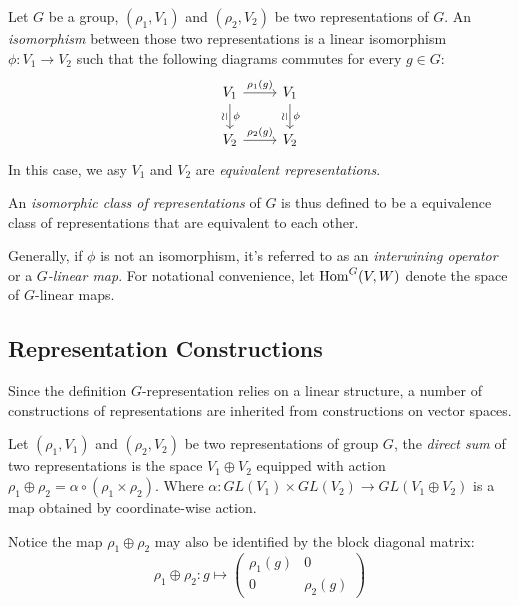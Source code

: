\begin{defn}
  Let $G$ be a group, $(\rho_1, V_1)$ and $(\rho_2, V_2)$ be two representations
  of $G$.  An \emph{isomorphism} between those two representations is a linear
  isomorphism $\phi : V_1 \to V_2$ such that the following diagrams commutes for
  every $g \in G$:
  \[
    \begin{tikzcd}
      V_1 \arrow[d, "\phi", "\vsimeq"'] \arrow[r, "\rho_1(g)"] & V_1 \arrow[d, "\vsimeq"', "\phi"]\\
      V_2 \arrow[r, "\rho_2(g)"] & V_2
    \end{tikzcd}
  \]
  In this case, we asy $V_1$ and $V_2$ are \emph{equivalent representations}.

  An \emph{isomorphic class of representations} of $G$ is thus defined to be a
  equivalence class of representations that are equivalent to each other.


  Generally, if $\phi$ is not an isomorphism, it's referred to as an
  \emph{interwining operator} or a \emph{$G$-linear map}.  For notational
  convenience, let $\operatorname{Hom}^G(V,W)$ denote the space of $G$-linear maps.
\end{defn}

\subsection{Representation Constructions}


Since the definition $G$-representation relies on a linear structure, a number
of constructions of representations are inherited from constructions on vector
spaces.

\begin{defn}
  Let $(\rho_1, V_1)$ and $(\rho_2, V_2)$ be two representations of group $G$,
  the \emph{direct sum} of two representations is the space $V_1 \oplus V_2$
  equipped with action $\rho_1 \oplus \rho_2 = \alpha \circ (\rho_1 \times
  \rho_2)$.  Where $\alpha : GL(V_1) \times GL(V_2) \to GL(V_1 \oplus V_2)$
  is a map obtained by coordinate-wise action.

  Notice the map $\rho_1 \oplus \rho_2$ may also be identified by the block
  diagonal matrix:
  \[
    \rho_1 \oplus \rho_2 : g \mapsto
    \begin{pmatrix}
      \rho_1(g) & 0\\
      0      & \rho_2(g)
    \end{pmatrix}
  \]
\end{defn}


